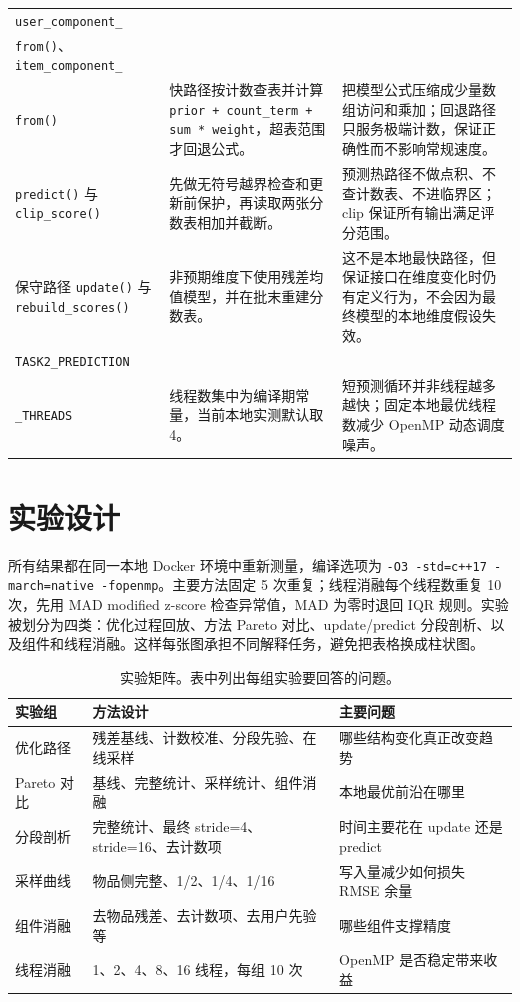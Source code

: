 \documentclass[UTF8,zihao=-4,scheme=plain]{ctexart}
\begin{document}
\begin{table}[H]
\begin{tabular}{>{\raggedright\arraybackslash}p{2.55cm}>{\raggedright\arraybackslash}p{4.45cm}>{\raggedright\arraybackslash}p{6.15cm}}
    \texttt{user\_component\_}\\\texttt{from()}、\texttt{item\_component\_}\\\texttt{from()} & 快路径按计数查表并计算 \texttt{prior + count\_term + sum * weight}，超表范围才回退公式。 & 把模型公式压缩成少量数组访问和乘加；回退路径只服务极端计数，保证正确性而不影响常规速度。\\
    \texttt{predict()} 与 \texttt{clip\_score()} & 先做无符号越界检查和更新前保护，再读取两张分数表相加并截断。 & 预测热路径不做点积、不查计数表、不进临界区；clip 保证所有输出满足评分范围。\\
    保守路径 \texttt{update()} 与 \texttt{rebuild\_scores()} & 非预期维度下使用残差均值模型，并在批末重建分数表。 & 这不是本地最快路径，但保证接口在维度变化时仍有定义行为，不会因为最终模型的本地维度假设失效。\\
    \texttt{TASK2\_PREDICTION}\\\texttt{\_THREADS} & 线程数集中为编译期常量，当前本地实测默认取 4。 & 短预测循环并非线程越多越快；固定本地最优线程数减少 OpenMP 动态调度噪声。\\
    \bottomrule
  \end{tabular}
\end{table}

\section{实验设计}

所有结果都在同一本地 Docker 环境中重新测量，编译选项为 \texttt{-O3 -std=c++17 -march=native -fopenmp}。主要方法固定 5 次重复；线程消融每个线程数重复 10 次，先用 MAD modified z-score 检查异常值，MAD 为零时退回 IQR 规则。实验被划分为四类：优化过程回放、方法 Pareto 对比、update/predict 分段剖析、以及组件和线程消融。这样每张图承担不同解释任务，避免把表格换成柱状图。

\begin{table}[H]
  \centering
  \caption{实验矩阵。表中列出每组实验要回答的问题。}
  \label{tab:matrix}
  \small
  \begin{tabular}{lll}
    \toprule
    实验组 & 方法设计 & 主要问题\\
    \midrule
    优化路径 & 残差基线、计数校准、分段先验、在线采样 & 哪些结构变化真正改变趋势\\
    Pareto 对比 & 基线、完整统计、采样统计、组件消融 & 本地最优前沿在哪里\\
    分段剖析 & 完整统计、最终 stride=4、stride=16、去计数项 & 时间主要花在 update 还是 predict\\
    采样曲线 & 物品侧完整、1/2、1/4、1/16 & 写入量减少如何损失 RMSE 余量\\
    组件消融 & 去物品残差、去计数项、去用户先验等 & 哪些组件支撑精度\\
    线程消融 & 1、2、4、8、16 线程，每组 10 次 & OpenMP 是否稳定带来收益\\
    \bottomrule
  \end{tabular}
\end{table}
\end{document}
